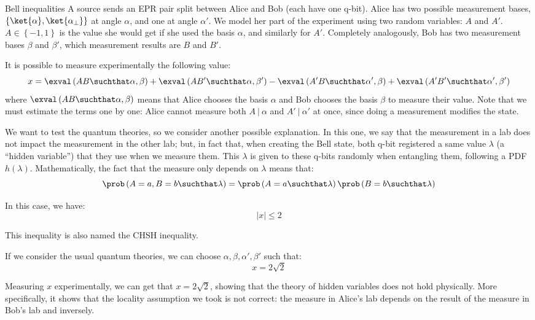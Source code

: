 \documentclass[a4paper]{article}
\begin{document}
\begin{parag}{Bell inequalities}
    A source sends an EPR pair split between Alice and Bob (each have one q-bit). Alice has two possible measurement bases, $\left\{\ket{\alpha}, \ket{\alpha_{\perp}}\right\}$ at angle $\alpha$, and one at angle $\alpha'$. We model her part of the experiment using two random variables: $A$ and $A'$. $A \in \left\{-1, 1\right\}$ is the value she would get if she used the basis $\alpha$, and similarly for $A'$. Completely analogously, Bob has two measurement bases $\beta$ and $\beta'$, which measurement results are $B$ and $B'$.

    It is possible to measure experimentally the following value:
    \[x = \exval\left(AB \suchthat \alpha, \beta\right) + \exval\left(A B' \suchthat \alpha, \beta'\right) - \exval\left(A' B \suchthat \alpha', \beta\right) + \exval\left(A'B' \suchthat \alpha', \beta'\right)\]
    where $\exval\left(AB \suchthat \alpha, \beta\right)$ means that Alice chooses the basis $\alpha$ and Bob chooses the basis $\beta$ to measure their value. Note that we must estimate the terms one by one: Alice cannot measure both $A\ |\ \alpha$ and $A'\ |\ \alpha'$ at once, since doing a measurement modifies the state.

    We want to test the quantum theories, so we consider another possible explanation. In this one, we say that the measurement in a lab does not impact the measurement in the other lab; but, in fact that, when creating the Bell state, both q-bit registered a same value $\lambda$ (a ``hidden variable'') that they use when we measure them. This $\lambda$ is given to these q-bits randomly when entangling them, following a PDF $h\left(\lambda\right)$. Mathematically, the fact that the measure only depends on $\lambda$ means that:
    \[\prob\left(A = a, B = b \suchthat \lambda\right) = \prob\left(A = a \suchthat \lambda\right) \prob\left(B = b \suchthat \lambda\right)\]

    In this case, we have: 
    \[\left|x\right| \leq 2\]

    This inequality is also named the CHSH inequality.
    
    If we consider the usual quantum theories, we can choose $\alpha, \beta, \alpha', \beta'$ such that: 
    \[x = 2\sqrt{2}\]

    Measuring $x$ experimentally, we can get that $x = 2\sqrt{2}$, showing that the theory of hidden variables does not hold physically. More specifically, it shows that the locality assumption we took is not correct: the measure in Alice's lab depends on the result of the measure in Bob's lab and inversely.


\end{parag}
\end{document}
